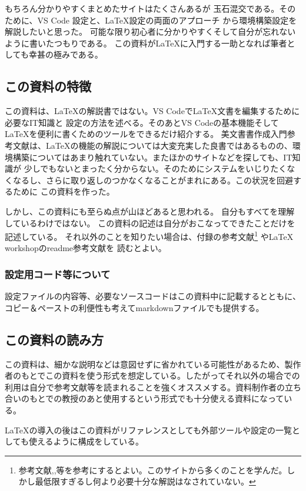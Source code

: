 \documentclass[titlepage]{ltjsarticle}
\begin{document}
もちろん分かりやすくまとめたサイトはたくさんあるが
玉石混交である。そのために、VS Code 設定と、\LaTeX 設定の両面のアプローチ
から環境構築設定を解説したいと思った。
可能な限り初心者に分かりやすくそして自分が忘れないように書いたつもりである。
この資料が\LaTeX に入門する一助となれば筆者としても幸甚の極みである。

\subsection{この資料の特徴}
この資料は、\LaTeX の解説書ではない。VS Codeで\LaTeX 文書を編集するために必要なIT知識と
設定の方法を述べる。そのあとVS Codeの基本機能そしてLaTeXを便利に書くためのツールをできるだけ紹介する。
美文書書作成入門参考文献\cite{美文書本}は、\LaTeX の機能の解説については大変充実した良書ではあるものの、環境構築についてはあまり触れていない。またほかのサイトなどを探しても、IT知識が
少しでもないとまったく分からない。そのためにシステムをいじりたくなくなるし、さらに取り返しのつかなくなることがまれにある。この状況を回避するために
この資料を作った。

しかし、この資料にも至らぬ点が山ほどあると思われる。
自分もすべてを理解しているわけではない。
この資料の記述は自分がおこなってできたことだけを記述している。
それ以外のことを知りたい場合は、付録の参考文献\footnote{参考文献\cite{完全導入ガイド},\cite{最高の環境latex},\cite{platex}等を参考にするとよい。このサイトから多くのことを学んだ。しかし最低限すぎるし何より必要十分な解説はなされていない。}
やLaTeX workshopのreadme参考文献\cite{LaTeXworkshop_README}を
読むとよい。

\subsubsection{設定用コード等について}
設定ファイルの内容等、必要なソースコードはこの資料中に記載するとともに、コピー＆ペーストの利便性も考えてmarkdownファイルでも提供する。


\subsection{この資料の読み方}
この資料は、細かな説明などは意図せずに省かれている可能性があるため、製作者のもとでこの資料を使う形式を想定している。したがってそれ以外の場合での利用は自分で参考文献等を読まれることを強くオススメする。資料制作者の立ち合いのもとでの教授のあと使用するという形式でも十分使える資料になっている。

\LaTeX の導入の後はこの資料がリファレンスとしても外部ツールや設定の一覧としても使えるように構成をしている。
\end{document}
